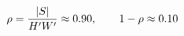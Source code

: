 \documentclass[preview]{standalone}
\begin{document}
\begin{align*}
\special{dvisvgm:raw <g id='unique000'>}\rho=\frac{|S|}{H'W'}\approx0.90,\qquad 1-\rho\approx0.10\special{dvisvgm:raw </g>}
\end{align*}
\end{document}
